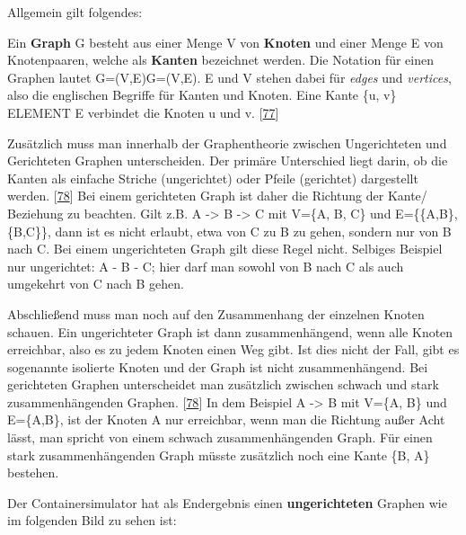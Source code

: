 \documentclass[
    headings=optiontotocandhead,%
    twoside,
    numbers=noenddot,%
    12pt, %
    titlepage, %
    parskip=full, %
    listof=leveldown, 
    numbers=noenddot, %
    a4paper,DIV=14,
    BCOR=15mm,
]{scrbook}
\renewenvironment{quote}{\begin{customblockquote}\list{}{\rightmargin=0em\leftmargin=0em}%
\item\relax\color{blockquote-text}\ignorespaces}{\unskip\unskip\endlist\end{customblockquote}}
\begin{document}
Allgemein gilt folgendes:

\begin{quote}
Ein \textbf{Graph} G besteht aus einer Menge V von \textbf{Knoten} und
einer Menge E von Knotenpaaren, welche als \textbf{Kanten} bezeichnet
werden. Die Notation für einen Graphen lautet G=(V,E)G=(V,E). E und V
stehen dabei für \emph{edges} und \emph{vertices}, also die englischen
Begriffe für Kanten und Knoten. Eine Kante \{u, v\} ELEMENT E verbindet
die Knoten u und v.
{[}\protect\hyperlink{ref-Uni-Bremen-Graphentheorie}{77}{]}
\end{quote}

Zusätzlich muss man innerhalb der Graphentheorie zwischen Ungerichteten
und Gerichteten Graphen unterscheiden. Der primäre Unterschied liegt
darin, ob die Kanten als einfache Striche (ungerichtet) oder Pfeile
(gerichtet) dargestellt werden.
{[}\protect\hyperlink{ref-Studyflix-Graphentheorie}{78}{]} Bei einem
gerichteten Graph ist daher die Richtung der Kante/ Beziehung zu
beachten. Gilt z.B. A -\textgreater{} B -\textgreater{} C mit V=\{A, B,
C\} und E=\{\{A,B\}, \{B,C\}\}, dann ist es nicht erlaubt, etwa von C zu
B zu gehen, sondern nur von B nach C. Bei einem ungerichteten Graph gilt
diese Regel nicht. Selbiges Beispiel nur ungerichtet: A - B - C; hier
darf man sowohl von B nach C als auch umgekehrt von C nach B gehen.

Abschließend muss man noch auf den Zusammenhang der einzelnen Knoten
schauen. Ein ungerichteter Graph ist dann zusammenhängend, wenn alle
Knoten erreichbar, also es zu jedem Knoten einen Weg gibt. Ist dies
nicht der Fall, gibt es sogenannte isolierte Knoten und der Graph ist
nicht zusammenhängend. Bei gerichteten Graphen unterscheidet man
zusätzlich zwischen schwach und stark zusammenhängenden Graphen.
{[}\protect\hyperlink{ref-Studyflix-Graphentheorie}{78}{]} In dem
Beispiel A -\textgreater{} B mit V=\{A, B\} und E=\{A,B\}, ist der
Knoten A nur erreichbar, wenn man die Richtung außer Acht lässt, man
spricht von einem schwach zusammenhängenden Graph. Für einen stark
zusammenhängenden Graph müsste zusätzlich noch eine Kante \{B, A\}
bestehen.

Der Containersimulator hat als Endergebnis einen \textbf{ungerichteten}
Graphen wie im folgenden Bild zu sehen ist:
\end{document}

